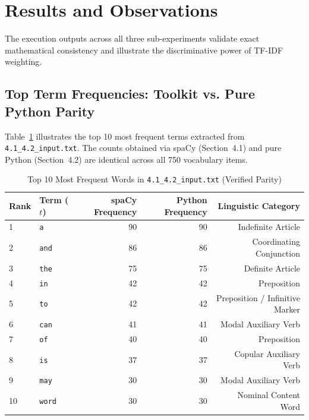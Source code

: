 \documentclass[12pt,a4paper]{report}
\begin{document}
\section{Results and Observations}
The execution outputs across all three sub-experiments validate exact mathematical consistency and illustrate the discriminative power of TF-IDF weighting.

\subsection{Top Term Frequencies: Toolkit vs. Pure Python Parity}
Table~\ref{tab:exp4_top_tf} illustrates the top 10 most frequent terms extracted from \texttt{4.1\_4.2\_input.txt}. The counts obtained via spaCy (Section~4.1) and pure Python (Section~4.2) are identical across all 750 vocabulary items.
\begin{table}[H]
\centering
\small
\caption{Top 10 Most Frequent Words in \texttt{4.1\_4.2\_input.txt} (Verified Parity)}
\label{tab:exp4_top_tf}
\begin{tabular}{llrrr}
\toprule
\textbf{Rank} & \textbf{Term ($t$)} & \textbf{spaCy Frequency} & \textbf{Python Frequency} & \textbf{Linguistic Category} \\
\midrule
1 & \texttt{a} & 90 & 90 & Indefinite Article \\
2 & \texttt{and} & 86 & 86 & Coordinating Conjunction \\
3 & \texttt{the} & 75 & 75 & Definite Article \\
4 & \texttt{in} & 42 & 42 & Preposition \\
5 & \texttt{to} & 42 & 42 & Preposition / Infinitive Marker \\
6 & \texttt{can} & 41 & 41 & Modal Auxiliary Verb \\
7 & \texttt{of} & 40 & 40 & Preposition \\
8 & \texttt{is} & 37 & 37 & Copular Auxiliary Verb \\
9 & \texttt{may} & 30 & 30 & Modal Auxiliary Verb \\
10 & \texttt{word} & 30 & 30 & Nominal Content Word \\
\bottomrule
\end{tabular}
\end{table}
\end{document}
